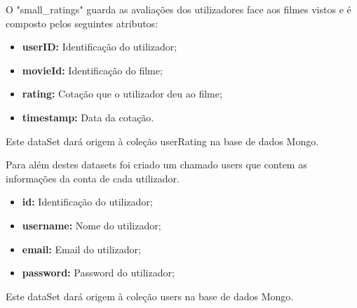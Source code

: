 \par O "small\_ratings" guarda as avaliações dos utilizadores face aos filmes vistos e é composto pelos seguintes atributos:

\begin{itemize}
    \item \textbf{userID:} Identificação do utilizador;
    \item \textbf{movieId:} Identificação do filme;
    \item \textbf{rating:} Cotação que o utilizador deu ao filme;
    \item \textbf{timestamp:} Data da cotação.
\end{itemize}
Este dataSet dará origem à coleção userRating na base de dados Mongo.    


\par Para além destes datasets foi criado um chamado users que contem as informações da conta de cada utilizador.

\begin{itemize}
    \item \textbf{id:} Identificação do utilizador;
    \item \textbf{username:} Nome do utilizador;
    \item \textbf{email:} Email do utilizador;
    \item \textbf{password:} Password do utilizador;
\end{itemize}

Este dataSet dará origem à coleção users na base de dados Mongo.    

\newpage
